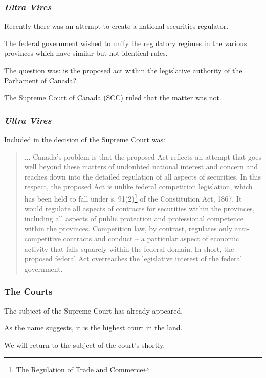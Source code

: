 \begin{frame}
\frametitle{\textit{Ultra Vires}}

Recently there was an attempt to create a national securities regulator.

The federal government wished to unify the regulatory regimes in the various provinces which have similar but not identical rules.

The question was: is the proposed act within the legislative authority of the Parliament of Canada?

The Supreme Court of Canada (SCC) ruled that the matter was not.

\end{frame}



\begin{frame}
\frametitle{\textit{Ultra Vires}}
Included in the decision of the Supreme Court was:
\begin{quote}
   ... Canada's problem is that the proposed Act reflects an attempt that goes well beyond these matters of undoubted national interest and concern and reaches down into the detailed regulation of all aspects of securities. In this respect, the proposed Act is unlike federal competition legislation, which has been held to fall under s. 91(2)\footnote{The Regulation of Trade and Commerce} of the Constitution Act, 1867. It would regulate all aspects of contracts for securities within the provinces, including all aspects of public protection and professional competence within the provinces. Competition law, by contrast, regulates only anti-competitive contracts and conduct -- a particular aspect of economic activity that falls squarely within the federal domain. In short, the proposed federal Act overreaches the legislative interest of the federal government.
\end{quote}
\end{frame}



\begin{frame}
\frametitle{The Courts}

The subject of the Supreme Court has already appeared.

As the name suggests, it is the highest court in the land.

We will return to the subject of the court's shortly.

\end{frame}



